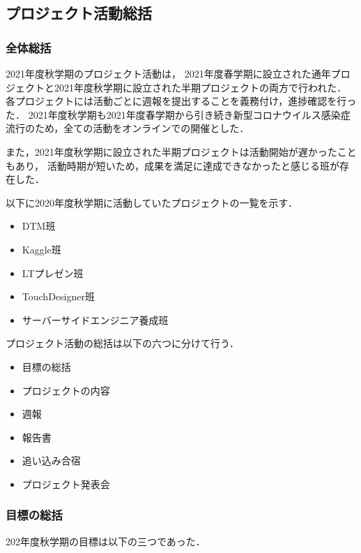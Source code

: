 \subsection*{プロジェクト活動総括}



\subsubsection*{全体総括}
2021年度秋学期のプロジェクト活動は，
2021年度春学期に設立された通年プロジェクトと2021年度秋学期に設立された半期プロジェクトの両方で行われた．
各プロジェクトには活動ごとに週報を提出することを義務付け，進捗確認を行った．
2021年度秋学期も2021年度春学期から引き続き新型コロナウイルス感染症流行のため，全ての活動をオンラインでの開催とした．

また，2021年度秋学期に設立された半期プロジェクトは活動開始が遅かったこともあり，
活動時期が短いため，成果を満足に達成できなかったと感じる班が存在した．

以下に2020年度秋学期に活動していたプロジェクトの一覧を示す．

\begin{itemize}
  \item DTM班
  \item Kaggle班
  \item LTプレゼン班
  \item TouchDesigner班
  \item サーバーサイドエンジニア養成班
\end{itemize}

プロジェクト活動の総括は以下の六つに分けて行う．

\begin{itemize}
  \item 目標の総括
  \item プロジェクトの内容
  \item 週報
  \item 報告書
  \item 追い込み合宿
  \item プロジェクト発表会
\end{itemize}

\subsubsection*{目標の総括}
202年度秋学期の目標は以下の三つであった．


